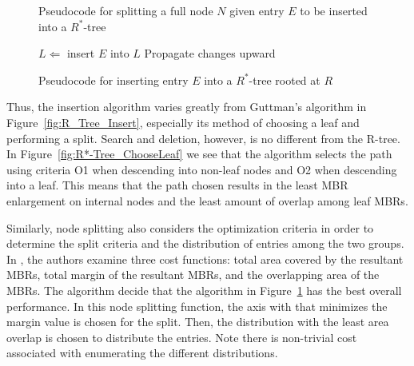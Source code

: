 \begin{figure}[ht!]
\begin{algorithmic}
		\EndFor
	\EndFunction
\end{algorithmic}
\caption{Pseudocode for splitting a full node $N$ given entry $E$ to be inserted into 
	a $R^{*}$-tree}
\label{fig:R*-Tree_Split}
\end{figure}

\begin{figure}[ht!]
\begin{algorithmic}
		\State $L\Leftarrow$ 
			\State insert $E$ into $L$
		\Else
				\State {}
			\Else
				\State {}
			\EndIf
		\EndIf
		\State Propagate changes upward
	\EndFunction
\end{algorithmic}
\caption{Pseudocode for inserting entry $E$ into a $R^{*}$-tree rooted at $R$}
\label{fig:R*-Tree_Insert}
\end{figure}

Thus, the insertion algorithm varies greatly from Guttman's algorithm in 
Figure~\ref{fig:R_Tree_Insert}, especially its method of choosing a leaf and performing a 
split. Search and deletion, however, is no different from the R-tree. In 
Figure~\ref{fig:R*-Tree_ChooseLeaf} we see that the algorithm selects the path using criteria
O1 when descending into non-leaf nodes and O2 when descending into a leaf. This means that
the path chosen results in the least MBR enlargement on internal nodes and the least 
amount of overlap among leaf MBRs. 

Similarly, node splitting also considers the optimization criteria in order to determine
the split criteria and the distribution of entries among the two groups. In \cite{Beckmann:1990:RER:93597.98741}, 
the authors examine three cost functions: total area covered by the resultant MBRs, total
margin of the resultant MBRs, and the overlapping area of the MBRs. The algorithm decide
that the algorithm in Figure~\ref{fig:R*-Tree_Split} has the best overall performance. In
this node splitting function, the axis with that minimizes the margin value is chosen for
the split. Then, the distribution with the least area overlap is chosen to distribute the
entries. Note there is non-trivial cost associated with enumerating the different 
distributions.

